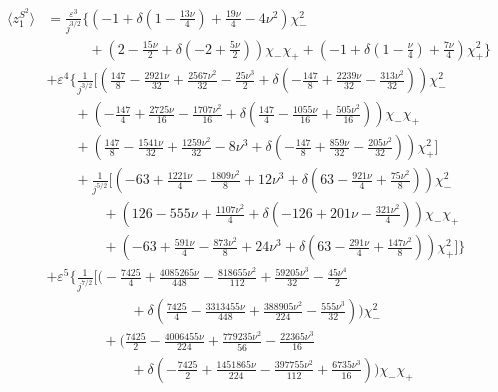 \documentclass[prd,superscriptaddress,preprintnumbers,tightenlines,nofootinbib, eqsecnum]{revtex4-2}
\newcommand{\nn}{\nonumber}
\begin{document}
\begin{align}
    \langle z_1^{S^2} \rangle &= \frac{\varepsilon ^3}{j^{3/2}}\Bigg\{\left(-1+\delta  \left(1-\frac{13 \nu }{4}\right)+\frac{19 \nu }{4}-4 \nu ^2\right) \chi_{-}^2 \nn\\
    &\qquad \quad+\left(2-\frac{15 \nu }{2}+\delta  \left(-2+\frac{5 \nu
   }{2}\right)\right) \chi_{-} \chi_{+}+\left(-1+\delta  \left(1-\frac{\nu }{4}\right)+\frac{7 \nu }{4}\right) \chi_{+}^2 \Bigg\} \nn\\
   &  +\varepsilon ^4
   \Bigg\{\frac{1}{j^{3/2}}\Bigg[\left(\frac{147}{8}-\frac{2921 \nu }{32}+\frac{2567 \nu ^2}{32}-\frac{25 \nu ^3}{2}+\delta  \left(-\frac{147}{8}+\frac{2239 \nu }{32}-\frac{313 \nu ^2}{32}\right)\right) \chi_{-}^2 \nn\\
   &\qquad +\left(-\frac{147}{4}+\frac{2725 \nu }{16}-\frac{1707 \nu ^2}{16}+\delta  \left(\frac{147}{4}-\frac{1055 \nu }{16}+\frac{505 \nu ^2}{16}\right)\right) \chi_{-} \chi_{+} \nn\\
   &\qquad  +\left(\frac{147}{8}-\frac{1541 \nu }{32}+\frac{1259 \nu ^2}{32}-8 \nu ^3+\delta  \left(-\frac{147}{8}+\frac{859 \nu }{32}-\frac{205 \nu ^2}{32}\right)\right) \chi_{+}^2\Bigg]\nn\\
   &\qquad +\frac{1}{j^{5/2}}\Bigg[\left(-63+\frac{1221 \nu }{4}-\frac{1809 \nu ^2}{8}+12 \nu ^3+\delta  \left(63-\frac{921 \nu }{4}+\frac{75 \nu ^2}{8}\right)\right) \chi_{-}^2 \nn\\
   &\qquad\qquad +\left(126-555 \nu
   +\frac{1107 \nu ^2}{4}+\delta  \left(-126+201 \nu -\frac{321 \nu ^2}{4}\right)\right) \chi_{-} \chi_{+} \nn\\
   &\qquad \qquad +\left(-63+\frac{591 \nu }{4}-\frac{873 \nu ^2}{8}+24 \nu ^3+\delta 
   \left(63-\frac{291 \nu }{4}+\frac{147 \nu ^2}{8}\right)\right) \chi_{+}^2\Bigg]\Bigg\}\nn\\
   & +\varepsilon ^5 \Bigg\{\frac{1}{j^{7/2}}\Bigg[\Bigg(-\frac{7425}{4}+\frac{4085265 \nu }{448}-\frac{818655 \nu
   ^2}{112}+\frac{59205 \nu ^3}{32}-\frac{45 \nu ^4}{2} \nn\\
   &\qquad\qquad\qquad +\delta  \left(\frac{7425}{4}-\frac{3313455 \nu }{448}+\frac{388905 \nu ^2}{224}-\frac{555 \nu ^3}{32}\right)\Bigg) \chi_{-}^2\nn\\
   & \qquad\qquad +\Bigg(\frac{7425}{2}-\frac{4006455 \nu }{224}+\frac{779235 \nu ^2}{56}-\frac{22365 \nu ^3}{16} \nn\\
   &\qquad\qquad\qquad +\delta  \left(-\frac{7425}{2}+\frac{1451865 \nu }{224}-\frac{397755 \nu ^2}{112}+\frac{6735 \nu
   ^3}{16}\right)\Bigg) \chi_{-} \chi_{+} \nn\\

\end{align}
\end{document}
